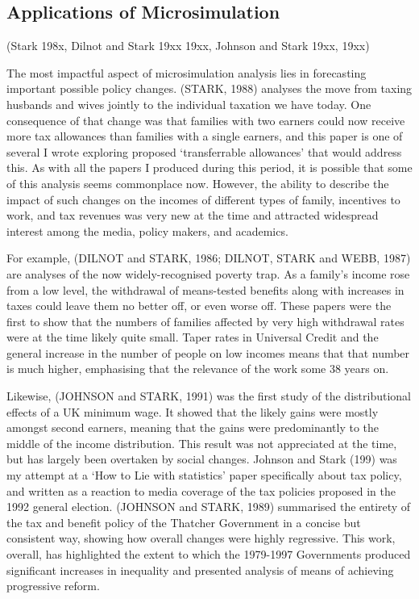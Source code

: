 \documentclass[
  letterpaper,
  DIV=11,
  numbers=noendperiod]{scrartcl}
\begin{document}
\subsection{Applications of
Microsimulation}\label{applications-of-microsimulation}

(Stark 198x, Dilnot and Stark 19xx 19xx, Johnson and Stark 19xx, 19xx)

The most impactful aspect of microsimulation analysis lies in
forecasting important possible policy changes. (STARK, 1988) analyses
the move from taxing husbands and wives jointly to the individual
taxation we have today. One consequence of that change was that families
with two earners could now receive more tax allowances than families
with a single earners, and this paper is one of several I wrote
exploring proposed `transferrable allowances' that would address this.
As with all the papers I produced during this period, it is possible
that some of this analysis seems commonplace now. However, the ability
to describe the impact of such changes on the incomes of different types
of family, incentives to work, and tax revenues was very new at the time
and attracted widespread interest among the media, policy makers, and
academics.

For example, (DILNOT and STARK, 1986; DILNOT, STARK and WEBB, 1987) are
analyses of the now widely-recognised poverty trap. As a family's income
rose from a low level, the withdrawal of means-tested benefits along
with increases in taxes could leave them no better off, or even worse
off. These papers were the first to show that the numbers of families
affected by very high withdrawal rates were at the time likely quite
small. Taper rates in Universal Credit and the general increase in the
number of people on low incomes means that that number is much higher,
emphasising that the relevance of the work some 38 years on.

Likewise, (JOHNSON and STARK, 1991) was the first study of the
distributional effects of a UK minimum wage. It showed that the likely
gains were mostly amongst second earners, meaning that the gains were
predominantly to the middle of the income distribution. This result was
not appreciated at the time, but has largely been overtaken by social
changes. Johnson and Stark (199) was my attempt at a `How to Lie with
statistics' paper specifically about tax policy, and written as a
reaction to media coverage of the tax policies proposed in the 1992
general election. (JOHNSON and STARK, 1989) summarised the entirety of
the tax and benefit policy of the Thatcher Government in a concise but
consistent way, showing how overall changes were highly regressive. This
work, overall, has highlighted the extent to which the 1979-1997
Governments produced significant increases in inequality and presented
analysis of means of achieving progressive reform.
\end{document}
